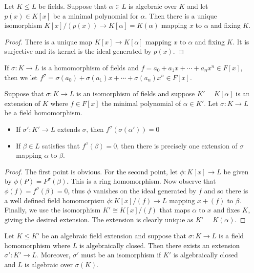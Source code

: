 \documentclass[twoside, a4paper, 10pt]{amsart}
\begin{document}
\begin{prop} Let $K \leq L$ be fields. Suppose that $\alpha \in L$ is algebraic over $K$ and let $p(x) \in K[x]$ be a minimal polynomial for $\alpha$. Then there is a unique isomorphism $K[x]/(p(x)) \to K[\alpha] = K(\alpha)$ mapping $x$ to $\alpha$ and fixing $K$. \end{prop}

\begin{proof} There is a unique map $K[x] \to K[\alpha]$ mapping $x$ to $\alpha$ and fixing $K$. It is surjective and its kernel is the ideal generated by $p(x)$. \end{proof}

If $\sigma: K \to L$ is a homomorphism of fields and $f = a_0 + a_1x + \cdots + a_nx^n \in F[x]$, then we let $f^{\sigma} = \sigma(a_0) + \sigma(a_1) x + \cdots + \sigma(a_n)x^n \in F[x]$.

\begin{lemma} Suppose that $\sigma: K \to L$ is an isomorphism of fields and suppose $K' = K[\alpha]$ is an extension of $K$ where $f \in F[x]$ the minimal polynomial of $\alpha \in K'$. Let $\sigma:K \to L$ be a field homomorphism.

\begin{itemize}
	\item If $\sigma': K' \to L$ extends $\sigma$, then $f^{\sigma}(\sigma(\alpha')) = 0$
	\item If $\beta \in L$ satisfies that $f^{\sigma}(\beta) = 0$, then there is precisely one extension of $\sigma$ mapping $\alpha$ to $\beta$.
\end{itemize}
\end{lemma}

\begin{proof} The first point is obvious. For the second point, let $\phi:K[x] \to L$ be given by $\phi(P) = P^{\sigma}(\beta)$. This is a ring homomorphism. Now observe that $\phi(f) = f^{\sigma}(\beta) = 0$, thus $\phi$ vanishes on the ideal generated by $f$ and so there is a well defined field homomorpism $\phi:K[x]/(f) \to L$ mapping $x + (f)$ to $\beta$. Finally, we use the isomorphism $ K' \cong K[x]/(f)$ that maps $\alpha$ to $x$ and fixes $K$, giving the desired extension. The extension is clearly unique as $K' = K(\alpha)$.

\end{proof}

\begin{prop} \label{prop: extend morphism to K'} Let $K \leq K'$ be an algebraic field extension and suppose that $\sigma:K \to L$ is a field homomorphism where $L$ is algebraically closed. Then there exists an extension $\sigma':K' \to L$. Moreover, $\sigma'$ must be an isomorphism if $K'$ is algebraically closed and $L$ is algebraic over $\sigma(K)$.

\end{prop}
\end{document}
